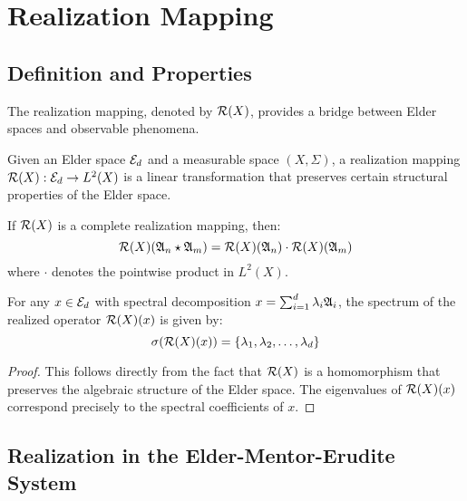 \chapter{Realization Mapping}

\section{Definition and Properties}

The realization mapping, denoted by $\mathcal{R}(X)$, provides a bridge between Elder spaces and observable phenomena.

\begin{definition}
Given an Elder space $\mathcal{E}_{d}$ and a measurable space $(X, \Sigma)$, a realization mapping $\mathcal{R}(X): \mathcal{E}_{d} \rightarrow L^2(X)$ is a linear transformation that preserves certain structural properties of the Elder space.
\end{definition}

\begin{theorem}
If $\mathcal{R}(X)$ is a complete realization mapping, then:
\begin{equation}
\mathcal{R}(X)(\mathfrak{A}_{n} \star \mathfrak{A}_{m}) = \mathcal{R}(X)(\mathfrak{A}_{n}) \cdot \mathcal{R}(X)(\mathfrak{A}_{m})
\end{equation}
where $\cdot$ denotes the pointwise product in $L^2(X)$.
\end{theorem}

\begin{lemma}
For any $x \in \mathcal{E}_{d}$ with spectral decomposition $x = \sum_{i=1}^{d} \lambda_i \mathfrak{A}_{i}$, the spectrum of the realized operator $\mathcal{R}(X)(x)$ is given by:
\begin{equation}
\sigma(\mathcal{R}(X)(x)) = \{\lambda_1, \lambda_2, \ldots, \lambda_d\}
\end{equation}
\end{lemma}

\begin{proof}
This follows directly from the fact that $\mathcal{R}(X)$ is a homomorphism that preserves the algebraic structure of the Elder space. The eigenvalues of $\mathcal{R}(X)(x)$ correspond precisely to the spectral coefficients of $x$.
\end{proof}

\section{Realization in the Elder-Mentor-Erudite System}

